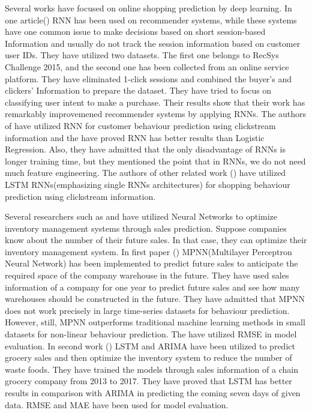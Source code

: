\documentclass[conference]{IEEEtran}
\begin{document}
\par Several works have focused on online shopping prediction by deep learning. In one article(\cite{hidasi2015session}) RNN has been used on recommender systems, while these systems have one common issue to make decisions based on short session-based Information and usually do not track the session information based on customer user IDs. They have utilized two datasets. The first one belongs to RecSys Challenge 2015, and the second one has been collected from an online service platform. They have eliminated 1-click sessions and combined the buyer's and clickers' Information to prepare the dataset.  They have tried to focus on classifying user intent to make a purchase. Their results show that their work has remarkably improvemened recommender systems by applying RNNs. The authors of \cite{lang2017understanding} have utilized RNN for customer behaviour prediction using clickstream information and the have proved RNN has better results than Logistic Regression. Also, they have admitted that the only disadvantage of RNNs is longer training time, but they mentioned the point that in RNNs, we do not need much feature engineering. The authors of other related work (\cite{toth2017predicting}) have utilized LSTM RNNs(emphasizing single RNNs architectures) for shopping behaviour prediction using clickstream information.  

\par Several researchers such as \cite{croda2019sales} and \cite{elmasdotter2018comparative} have utilized Neural Networks to optimize inventory management systems through sales prediction. Suppose companies know about the number of their future sales. In that case, they can optimize their inventory management system. In first paper (\cite{croda2019sales}) MPNN(Multilayer Perceptron Neural Network) has been implemented to predict future sales to anticipate the required space of the company warehouse in the future. They have used sales information of a company for one year to predict future sales and see how many warehouses should be constructed in the future. They have admitted that MPNN does not work precisely in large time-series datasets for behaviour prediction. However, still, MPNN outperforms traditional machine learning methods in small datasets for non-linear behaviour prediction. The have utilized RMSE in model evaluation. In second work (\cite{elmasdotter2018comparative}) LSTM and ARIMA have been utilized to predict grocery sales and then optimize the inventory system to reduce the number of waste foods. They have trained the models through sales information of a chain grocery company from 2013 to 2017. They have proved that LSTM has better results in comparison with ARIMA in predicting the coming seven days of given data. RMSE and MAE have been used for model evaluation. 
\end{document}
